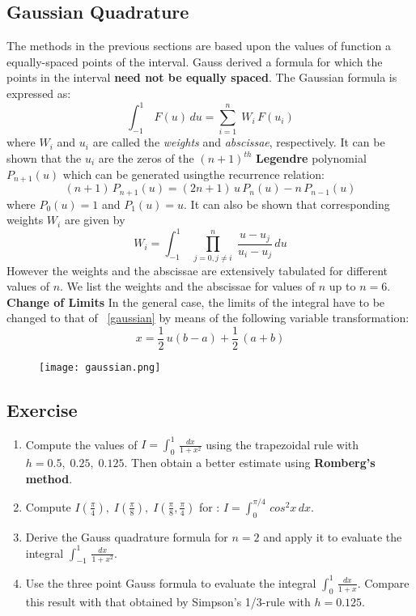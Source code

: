 \documentclass[aima203_lecturenotes_ku.tex]{subfiles}
\begin{document}
\subsection{Gaussian Quadrature}
The methods in the previous sections are based upon the values of function a equally-spaced points of the interval. Gauss derived a formula for which the points in the interval \textbf{need not be equally spaced}.
The Gaussian formula is expressed as:
\begin{equation}
  \label{gaussian}
\int_{-1}^{1} \, F(u)\, du = \sum_{i=1}^n \; W_i\, F(u_i)
\end{equation}
where $W_i$ and $u_i$ are called the \textit{weights} and \textit{abscissae}, respectively. It can be shown that the $u_i$ are the zeros of the $(n+1)^{th}$ \textbf{Legendre} polynomial $P_{n+1}(u)$ which can be generated usingthe recurrence relation:
\begin{equation*}
  (n+1)\,P_{n+1}(u) = (2n+1)\,u\,P_{n}(u) -n\,P_{n-1}(u)
\end{equation*}
where $P_0(u)=1$ and $P_1(u)=u$. It can also be shown that corresponding weights $W_i$ are given by
\begin{equation*}
  W_i =\int_{-1}^{1}\; \prod_{j=0, j\neq i}^n \; \frac{u-u_j}{u_i - u_j}\, du
\end{equation*}
However the weights and the abscissae are extensively tabulated for different values of $n$. We list the weights and the abscissae for values of $n$ up to $n=6$. \\[1mm]
\textbf{Change of Limits}
In the general case, the limits of the integral have to be changed to that of ~\ref{gaussian} by means of the following variable transformation:
\begin{equation*}
  x = \frac{1}{2} \, u(b-a) + \frac{1}{2}\, (a+b)
\end{equation*}

\begin{figure}[h]
  \centering
\texttt{[image: gaussian.png]}
\end{figure}
\subsection{Exercise}
\begin{enumerate}
 \item Compute the values of $I = \displaystyle \int_0^1 \, \frac{dx}{1+x^2}$ using the trapezoidal rule with $h=0.5, \; 0.25, \; 0.125$. Then obtain a better estimate using \textbf{Romberg's method}.

\item Compute $\displaystyle I\left (\frac{\pi}{4} \right ), \; I\left (\frac{\pi}{8} \right ), \; I\left (\frac{\pi}{8}, \frac{\pi}{4} \right )$ for : $I = \displaystyle \int_0^{\pi/4} \, cos^2x\, dx$.
\item Derive the Gauss quadrature formula for $n=2$ and apply it to evaluate the integral $\displaystyle \int_{-1}^1 \, \frac{dx}{1+x^2}$.

\item Use the three point Gauss formula to evaluate the integral $\displaystyle \int_0^1 \, \frac{dx}{1+x}$. Compare this result with that obtained by Simpson's 1/3-rule with $h=0.125$.
\end{enumerate}
\end{document}
